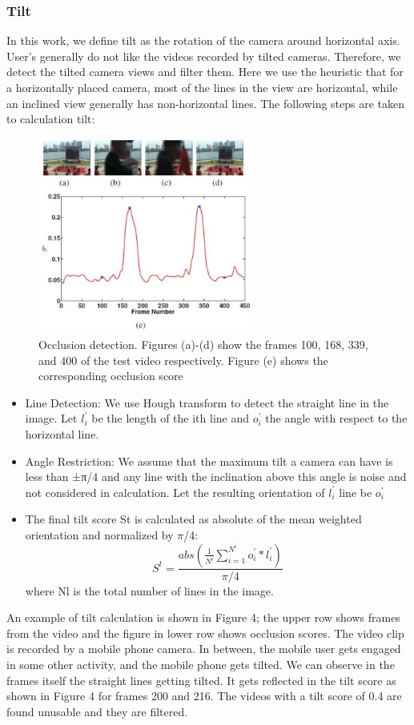 \documentclass{sig-alternate}
\begin{document}
{{{\subsubsection{Tilt}
In this work, we define tilt as the rotation of the camera around
horizontal axis. User’s generally do not like the videos recorded
by tilted cameras. Therefore, we detect the tilted camera views
and filter them. Here we use the heuristic that for a horizontally
placed camera, most of the lines in the view are horizontal, while
an inclined view generally has non-horizontal lines. The following
steps are taken to calculation tilt:

\begin{figure}
    \centering
    \includegraphics[width=70mm]{video.pdf}
    \caption{Occlusion detection. Figures (a)-(d) show the frames
100, 168, 339, and 400 of the test video respectively. Figure (e)
shows the corresponding occlusion score}
    \label{fig:my_label}
\end{figure}


\begin{itemize}
    \item Line Detection: We use Hough transform to detect the straight
line in the image. Let $l^'_i$ be the length of the ith line and $o^'_i$
the angle with respect to the horizontal line.
  \item Angle Restriction: We assume that the maximum tilt a camera
can have is less than ±π/4 and any line with the inclination
above this angle is noise and not considered in calculation.
Let the resulting orientation of $l^'_i$ line be $o^'_i$
  \item The final tilt score St is calculated as absolute of the mean
weighted orientation and normalized by $\pi$/4:
$$
  S^t=\frac{abs(\frac{1}{N^i}\sum^{N^i}_{i=1}{o^'_i}*{l^'_i})}{{\pi}/4}
$$
where Nl is the total number of lines in the image.
\end{itemize}
An example of tilt calculation is shown in Figure 4; the upper
row shows frames from the video and the figure in lower row shows
occlusion scores. The video clip is recorded by a mobile phone
camera. In between, the mobile user gets engaged in some other
activity, and the mobile phone gets tilted. We can observe in the
frames itself the straight lines getting tilted. It gets reflected in the
tilt score as shown in Figure 4 for frames 200 and 216. The videos
with a tilt score of 0.4 are found unusable and they are filtered.



}}}
\end{document}
